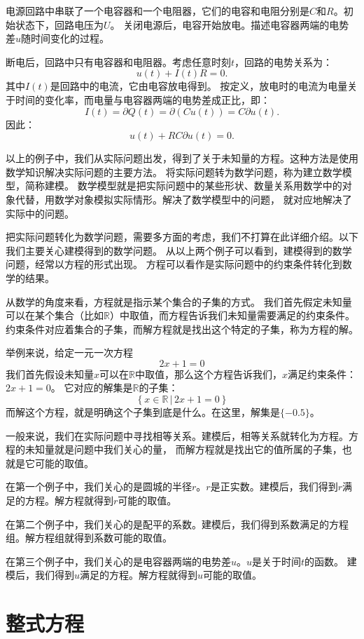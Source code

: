 \documentclass[12pt,UTF8,fontset=none]{ctexbook}
\begin{document}
\begin{ex}
    电源回路中串联了一个电容器和一个电阻器，它们的电容和电阻分别是$C$和$R$。初始状态下，回路电压为$U$。
    关闭电源后，电容开始放电。描述电容器两端的电势差$u$随时间变化的过程。
\end{ex}

断电后，回路中只有电容器和电阻器。考虑任意时刻$t$，回路的电势关系为：
$$ u(t) + I(t)R = 0.$$
其中$I(t)$是回路中的电流，它由电容放电得到。
按定义，放电时的电流为电量关于时间的变化率，而电量与电容器两端的电势差成正比，即：
$$ I(t) = \partial Q(t) = \partial (Cu(t)) = C\partial  u(t).$$
因此：
$$ u(t) + RC\partial  u(t) = 0.$$

以上的例子中，我们从实际问题出发，得到了关于未知量的方程。这种方法是使用数学知识解决实际问题的主要方法。
将实际问题转为数学问题，称为建立数学模型，简称建模。
数学模型就是把实际问题中的某些形状、数量关系用数学中的对象代替，用数学对象模拟实际情形。解决了数学模型中的问题，
就对应地解决了实际中的问题。

把实际问题转化为数学问题，需要多方面的考虑，我们不打算在此详细介绍。以下我们主要关心建模得到的数学问题。
从以上两个例子可以看到，建模得到的数学问题，经常以方程的形式出现。
方程可以看作是实际问题中的约束条件转化到数学的结果。

从数学的角度来看，方程就是指示某个集合的子集的方式。
我们首先假定未知量可以在某个集合（比如$\mathbb{R}$）中取值，而方程告诉我们未知量需要满足的约束条件。
约束条件对应着集合的子集，而解方程就是找出这个特定的子集，称为方程的解。

举例来说，给定一元一次方程
$$ 2x + 1 = 0$$
我们首先假设未知量$x$可以在$\mathbb{R}$中取值，那么这个方程告诉我们，$x$满足约束条件：$2x+1=0$。
它对应的解集是$\mathbb{R}$的子集：
$$ \left\{ x\in\mathbb{R} \, | \, 2x + 1 = 0 \right\} $$
而解这个方程，就是明确这个子集到底是什么。在这里，解集是$\{-0.5\}$。

一般来说，我们在实际问题中寻找相等关系。建模后，相等关系就转化为方程。方程的未知量就是问题中我们关心的量，
而解方程就是找出它的值所属的子集，也就是它可能的取值。

在第一个例子中，我们关心的是圆城的半径$r$。$r$是正实数。建模后，我们得到$r$满足的方程。解方程就得到$r$可能的取值。

在第二个例子中，我们关心的是配平的系数。建模后，我们得到系数满足的方程组。解方程组就得到系数可能的取值。

在第三个例子中，我们关心的是电容器两端的电势差$u$。$u$是关于时间$t$的函数。
建模后，我们得到$u$满足的方程。解方程就得到$u$可能的取值。

\section{整式方程}
\end{document}
